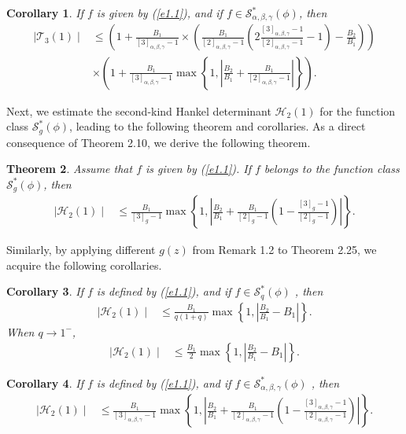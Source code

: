\documentclass[11pt,twoside, reqno]{article}
\newtheorem{theorem}{Theorem}[section]
\newtheorem{corollary}[theorem]{Corollary}
\theoremstyle{definition}
\begin{document}
\begin{corollary}
If $f$ is given by (\ref{e1.1}), and if $f\in\mathcal{S}^{\ast }_{\alpha, \beta, \gamma}(\phi)$, then
\begin{align}\nonumber
\mid \mathcal{T}_3(1)\mid &\leq \left(1+\frac{B_{1}}{[3]_{\alpha, \beta, \gamma}-1}\times\left(\frac{B_{1}}{[2]_{\alpha, \beta, \gamma}-1}\left(2\frac{[3]_{\alpha, \beta, \gamma}-1}{[2]_{\alpha, \beta, \gamma}-1}-1\right)-\frac{B_{2}}{B_{1}}\right)\right)\\\nonumber
&\times\left(1+\frac{B_{1}}{[3]_{\alpha, \beta, \gamma}-1}\max\left\{1, \left|\frac{B_{2}}{B_{1}}+\frac{B_{1}}{[2]_{\alpha, \beta, \gamma}-1}\right|\right\}\right).
\end{align}
\end{corollary}
Next, we estimate the second-kind Hankel determinant $\mathcal{H}_2(1)$ for the function class $\mathcal{S}^{\ast }_{g}(\phi)$, leading to the following theorem and corollaries. As a direct consequence of Theorem 2.10, we derive the following theorem.
\begin{theorem}
Assume that $f$ is given by (\ref{e1.1}). If $f$ belongs to the function class $\mathcal{S}^{\ast }_{g}(\phi)$, then
\begin{align}\nonumber
\mid \mathcal{H}_2(1)\mid &\leq \frac{B_{1}}{[3]_{g}-1}\max\left\{1,\left|\frac{B_{2}}{B_{1}}+
\frac{B_{1}}{[2]_{g}-1}\left(1-\frac{[3]_{g}-1}{[2]_{g}-1}\right)\right|\right\}.
\end{align}

\end{theorem}
Similarly, by applying different $g(z)$ from Remark 1.2 to Theorem 2.25, we acquire the following corollaries.
\begin{corollary}
If $f$ is defined by (\ref{e1.1}), and if $f\in\mathcal{S}^{\ast }_{q}(\phi)$ , then
\begin{align}\nonumber
\mid \mathcal{H}_2(1)\mid &\leq \frac{B_{1}}{q(1+q)}\max\left\{1,\left|\frac{B_{2}}{B_{1}}-B_{1}\right|\right\}.
\end{align}
When $q\rightarrow1^{-}$,
\begin{align}\nonumber
\mid \mathcal{H}_2(1)\mid &\leq \frac{B_{1}}{2}\max\left\{1,\left|\frac{B_{2}}{B_{1}}-B_{1}\right|\right\}.
\end{align}
\end{corollary}

\begin{corollary}
If $f$ is defined by (\ref{e1.1}), and if $f\in\mathcal{S}^{\ast }_{\alpha, \beta, \gamma}(\phi)$ , then
\begin{align}\nonumber
\mid \mathcal{H}_2(1)\mid &\leq \frac{B_{1}}{[3]_{\alpha, \beta, \gamma}-1}\max\left\{1,\left|\frac{B_{2}}{B_{1}}+
\frac{B_{1}}{[2]_{\alpha, \beta, \gamma}-1}\left(1-\frac{[3]_{\alpha, \beta, \gamma}-1}{[2]_{\alpha, \beta, \gamma}-1}\right)\right|\right\}.
\end{align}
\end{corollary}
\end{document}
